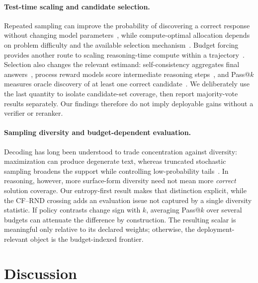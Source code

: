 \documentclass[11pt]{article}
\begin{document}
\paragraph{Test-time scaling and candidate selection.}
Repeated sampling can improve the probability of discovering a correct response without changing model parameters~\citep{brown2024monkeys}, while compute-optimal allocation depends on problem difficulty and the available selection mechanism~\citep{snell2025scaling}. Budget forcing provides another route to scaling reasoning-time compute within a trajectory~\citep{muennighoff2025s1}. Selection also changes the relevant estimand: self-consistency aggregates final answers~\citep{wang2023selfconsistency}, process reward models score intermediate reasoning steps~\citep{lightman2024verify}, and Pass@$k$ measures oracle discovery of at least one correct candidate~\citep{chen2021codex}. We deliberately use the last quantity to isolate candidate-set coverage, then report majority-vote results separately. Our findings therefore do not imply deployable gains without a verifier or reranker.

\paragraph{Sampling diversity and budget-dependent evaluation.}
Decoding has long been understood to trade concentration against diversity: maximization can produce degenerate text, whereas truncated stochastic sampling broadens the support while controlling low-probability tails~\citep{holtzman2020degeneration}. In reasoning, however, more surface-form diversity need not mean more \emph{correct} solution coverage. Our entropy-first result makes that distinction explicit, while the CF--RND crossing adds an evaluation issue not captured by a single diversity statistic. If policy contrasts change sign with $k$, averaging Pass@$k$ over several budgets can attenuate the difference by construction. The resulting scalar is meaningful only relative to its declared weights; otherwise, the deployment-relevant object is the budget-indexed frontier.

\section{Discussion}
\end{document}

